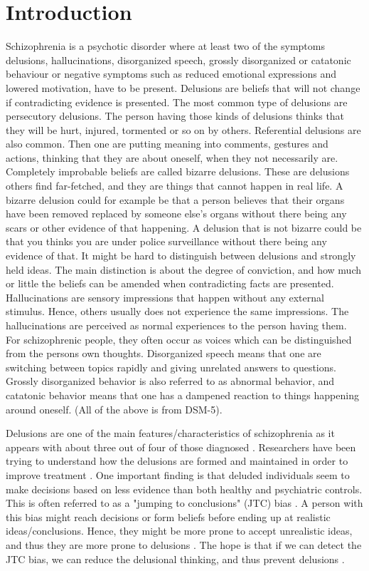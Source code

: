 \newpage
\section{Introduction}
Schizophrenia is a psychotic disorder where at least two of the symptoms delusions, hallucinations, disorganized speech, grossly disorganized or catatonic behaviour or negative symptoms such as reduced emotional expressions and lowered motivation, have to be present. 
Delusions are beliefs that will not change if contradicting evidence is presented. The most common type of delusions are persecutory delusions. The person having those kinds of delusions thinks that they will be hurt, injured, tormented or so on by others. Referential delusions are also common. Then one are putting meaning into comments, gestures and actions, thinking that they are about oneself, when they not necessarily are. Completely improbable beliefs are called bizarre delusions. These are delusions others find far-fetched, and they are things that cannot happen in real life. A bizarre delusion could for example be that a person believes that their organs have been removed replaced by someone else's organs without there being any scars or other evidence of that happening. A delusion that is not bizarre could be that you thinks you are under police surveillance without there being any evidence of that. It might be hard to distinguish between delusions and strongly held ideas. The main distinction is about the degree of conviction, and how much or little the beliefs can be amended when contradicting facts are presented. 
Hallucinations are sensory impressions that happen without any external stimulus. Hence, others usually does not experience the same impressions. The hallucinations are perceived as normal experiences to the person having them. For schizophrenic people, they often occur as voices which can be distinguished from the persons own thoughts. 
Disorganized speech means that one are switching between topics rapidly and giving unrelated answers to questions. 
Grossly disorganized behavior is also referred to as abnormal behavior, and catatonic behavior means that one has a dampened reaction to things happening around oneself. (All of the above is from DSM-5).

Delusions are one of the main features/characteristics of schizophrenia as it appears with about three out of four of those diagnosed \citep{garety2011}. Researchers have been trying to understand how the delusions are formed and maintained in order to improve treatment \citep{dudley_meta_2016}. One important finding is that deluded individuals seem to make decisions based on less evidence than both healthy and psychiatric controls. This is often referred to as a "jumping to conclusions" (JTC) bias \citep{dudley_meta_2016}. A person with this bias might reach decisions or form beliefs before ending up at realistic ideas/conclusions. Hence, they might be more prone to accept unrealistic ideas, and thus they are more prone to delusions \citep{dudley_meta_2016}. The hope is that if we can detect the JTC bias, we can reduce the delusional thinking, and thus prevent delusions \citep{dudley_meta_2016}.

